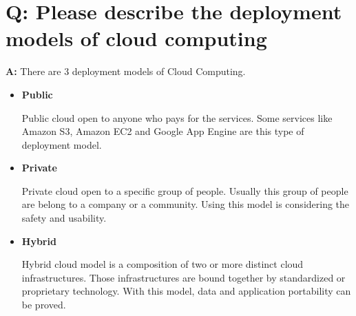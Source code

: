 \documentclass[a4paper]{article}
\begin{document}
\vspace{3mm} 

\section{ Q: Please describe the deployment models of cloud computing}

\hspace{1cm}\textbf{A:} There are 3 deployment models of Cloud Computing.
\begin{itemize}
\item \textbf{Public}

Public cloud open to anyone who pays for the services. Some services like Amazon S3, Amazon EC2 and Google App Engine are this type of deployment model.

\vspace{1mm} 

\item \textbf{Private}

Private cloud open to a specific group of people. Usually this group of people are belong to a company or a community. Using this model is considering the safety and usability.

\vspace{1mm} 

\item \textbf{Hybrid}

Hybrid cloud model is a composition of two or more distinct cloud infrastructures. Those infrastructures are bound together by standardized or proprietary technology. With this model, data and application portability can be proved.

\end{itemize}
\end{document}
